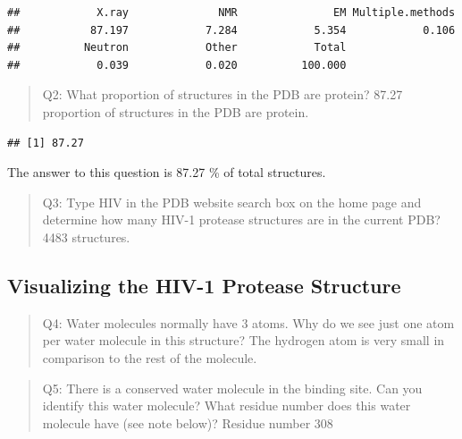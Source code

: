 \documentclass[
]{article}
\newenvironment{Shaded}{\begin{snugshade}}{\end{snugshade}}
\newcommand{\DecValTok}[1]{\textcolor[rgb]{0.00,0.00,0.81}{#1}}
\newcommand{\FunctionTok}[1]{\textcolor[rgb]{0.00,0.00,0.00}{#1}}
\newcommand{\NormalTok}[1]{#1}
\newcommand{\OtherTok}[1]{\textcolor[rgb]{0.56,0.35,0.01}{#1}}
\newcommand{\SpecialCharTok}[1]{\textcolor[rgb]{0.00,0.00,0.00}{#1}}
\begin{document}
\begin{verbatim}
##            X.ray              NMR               EM Multiple.methods 
##           87.197            7.284            5.354            0.106 
##          Neutron            Other            Total 
##            0.039            0.020          100.000
\end{verbatim}

\begin{quote}
Q2: What proportion of structures in the PDB are protein? 87.27
proportion of structures in the PDB are protein.
\end{quote}

\begin{Shaded}
\end{Shaded}

\begin{verbatim}
## [1] 87.27
\end{verbatim}

The answer to this question is 87.27 \% of total structures.

\begin{quote}
Q3: Type HIV in the PDB website search box on the home page and
determine how many HIV-1 protease structures are in the current PDB?
4483 structures.
\end{quote}

\hypertarget{visualizing-the-hiv-1-protease-structure}{%
\subsection{Visualizing the HIV-1 Protease
Structure}\label{visualizing-the-hiv-1-protease-structure}}

\begin{quote}
Q4: Water molecules normally have 3 atoms. Why do we see just one atom
per water molecule in this structure? The hydrogen atom is very small in
comparison to the rest of the molecule.
\end{quote}

\begin{quote}
Q5: There is a conserved water molecule in the binding site. Can you
identify this water molecule? What residue number does this water
molecule have (see note below)? Residue number 308
\end{quote}
\end{document}
